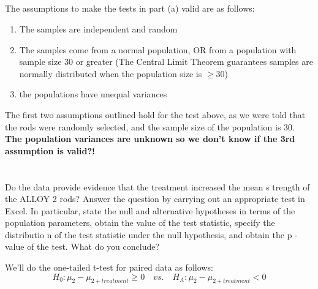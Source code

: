\documentclass[letterpaper]{article}
\begin{document}
\subsection{}%

The assumptions to make the tests in part (a) valid are as follows:
\begin{enumerate}
 \item The samples are independent and random
 \item The samples come from a normal population,
       OR from a population with sample size 30 or greater
       (The Central Limit Theorem guarantees samples are normally distributed
       when the population size is $\geq 30$)
 \item the populations have unequal variances
\end{enumerate}

The first two assumptions outlined hold for the test above, as we were told that the
rods were randomly selected, and the sample size of the population is 30.
\textbf{The population variances are unknown so we don't know if the 3rd assumption is valid?!}

\section{}%

\subsection{}%
Do the data provide evidence that the treatment increased the mean s trength of
the ALLOY 2  rods? Answer the question by carrying out an appropriate test in
Excel.  In particular, state  the null  and alternative hypotheses in terms of
the population parameters, obtain the value of the test  statistic,  specify the
distributio n of the test statistic under the null hypothesis, and obtain the  p
- value of the test. What do you conclude?

We'll do the one-tailed t-test for paired data as follows:\\
$$H_0: \mu_2 - \mu_{2+treatment} \geq 0  \quad vs. \quad H_A: \mu_2 - \mu_{2+treatment} < 0 $$
\end{document}
